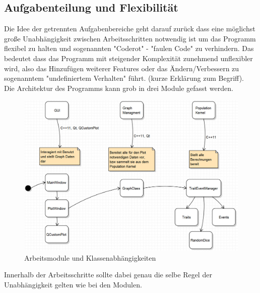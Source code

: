\documentclass[11pt, a4paper, german]{article}
\begin{document}
	\subsection{Aufgabenteilung und Flexibilität}
	Die Idee der getrennten Aufgabenbereiche geht darauf zurück dass eine möglichst große Unabhängigkeit zwischen Arbeitsschritten notwendig ist um das Programm flexibel zu halten und sogenannten "{}Coderot"{} - "{}faulen Code"{} zu verhindern. Das bedeutet dass das Programm mit steigender Komplexität zunehmend unflexibler wird, also das Hinzufügen weiterer Features oder das Ändern/Verbessern zu sogenanntem "{}undefiniertem Verhalten"{} führt. (kurze Erklärung zum Begriff).\\
	Die Architektur des Programms kann grob in drei Module gefasst werden. 
	\begin{figure}[H]
		\centering
		\includegraphics[width=0.7\linewidth]{./Pictures/Bild_Module}
		\caption[Module]{Arbeitsmodule und Klassenabhängigkeiten}
		\label{Module und Klassen}
	\end{figure}
	Innerhalb der Arbeitsschritte sollte dabei genau die selbe Regel der Unabhängigkeit gelten wie bei den Modulen.
	
\end{document}
